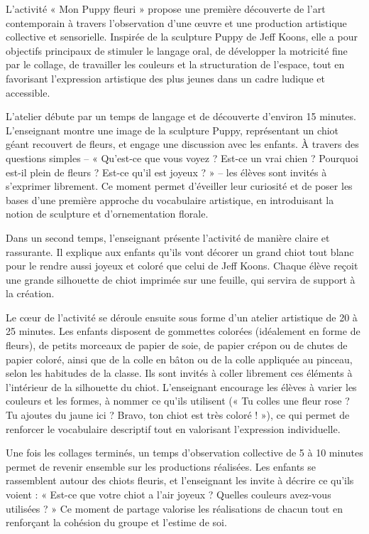 \documentclass[12pt]{article}
\begin{document}
L’activité « Mon Puppy fleuri » propose une première découverte de l’art contemporain à travers l’observation d’une œuvre et une production artistique collective et sensorielle. Inspirée de la sculpture Puppy de Jeff Koons, elle a pour objectifs principaux de stimuler le langage oral, de développer la motricité fine par le collage, de travailler les couleurs et la structuration de l’espace, tout en favorisant l’expression artistique des plus jeunes dans un cadre ludique et accessible.

L’atelier débute par un temps de langage et de découverte d’environ 15 minutes. L’enseignant montre une image de la sculpture Puppy, représentant un chiot géant recouvert de fleurs, et engage une discussion avec les enfants. À travers des questions simples – « Qu’est-ce que vous voyez ? Est-ce un vrai chien ? Pourquoi est-il plein de fleurs ? Est-ce qu’il est joyeux ? » – les élèves sont invités à s’exprimer librement. Ce moment permet d’éveiller leur curiosité et de poser les bases d’une première approche du vocabulaire artistique, en introduisant la notion de sculpture et d’ornementation florale.

Dans un second temps, l’enseignant présente l’activité de manière claire et rassurante. Il explique aux enfants qu’ils vont décorer un grand chiot tout blanc pour le rendre aussi joyeux et coloré que celui de Jeff Koons. Chaque élève reçoit une grande silhouette de chiot imprimée sur une feuille, qui servira de support à la création.

Le cœur de l’activité se déroule ensuite sous forme d’un atelier artistique de 20 à 25 minutes. Les enfants disposent de gommettes colorées (idéalement en forme de fleurs), de petits morceaux de papier de soie, de papier crépon ou de chutes de papier coloré, ainsi que de la colle en bâton ou de la colle appliquée au pinceau, selon les habitudes de la classe. Ils sont invités à coller librement ces éléments à l’intérieur de la silhouette du chiot. L’enseignant encourage les élèves à varier les couleurs et les formes, à nommer ce qu’ils utilisent (« Tu colles une fleur rose ? Tu ajoutes du jaune ici ? Bravo, ton chiot est très coloré ! »), ce qui permet de renforcer le vocabulaire descriptif tout en valorisant l’expression individuelle.

Une fois les collages terminés, un temps d’observation collective de 5 à 10 minutes permet de revenir ensemble sur les productions réalisées. Les enfants se rassemblent autour des chiots fleuris, et l’enseignant les invite à décrire ce qu’ils voient : « Est-ce que votre chiot a l’air joyeux ? Quelles couleurs avez-vous utilisées ? » Ce moment de partage valorise les réalisations de chacun tout en renforçant la cohésion du groupe et l’estime de soi.
\end{document}
